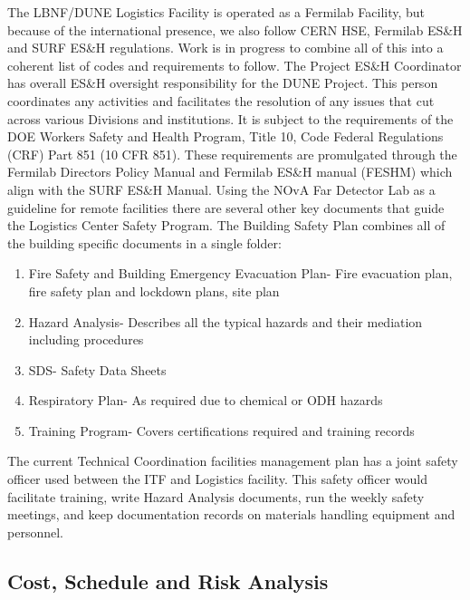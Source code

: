 The LBNF/DUNE Logistics Facility is operated as a Fermilab Facility, but because of the international presence, we also follow CERN HSE, Fermilab ES\&H and SURF ES\&H regulations.  Work is in progress to combine all of this into a coherent list of codes and requirements to follow. The  Project ES\&H Coordinator has overall ES\&H oversight responsibility for the DUNE Project.  This person coordinates any activities and facilitates the resolution of any issues that cut across various Divisions and institutions. It is subject to the requirements of the DOE Workers Safety and Health Program, Title 10, Code Federal Regulations (CRF) Part 851 (10 CFR 851). These requirements are promulgated through the Fermilab Directors Policy Manual and Fermilab ES\&H manual (FESHM) which align with the SURF ES\&H Manual. 
Using the NOvA Far Detector Lab as a guideline for remote facilities there are several other key documents that guide the Logistics Center Safety Program.  The Building Safety Plan combines all of the building specific documents in a single folder:

\begin{enumerate}
\item	Fire Safety and Building Emergency Evacuation Plan- Fire evacuation plan, fire safety plan and lockdown plans, site plan
\item	Hazard Analysis- Describes all the typical hazards and their mediation including procedures 
\item	SDS- Safety Data Sheets
\item	Respiratory Plan- As required due to chemical or ODH hazards
\item	Training Program- Covers certifications required and  training records
\end{enumerate}

The current Technical Coordination facilities management plan has a joint safety officer used between the ITF and Logistics facility. This safety officer would facilitate training, write Hazard Analysis documents, run the weekly safety meetings, and keep documentation records on materials handling equipment and personnel. 


\subsection{Cost, Schedule and Risk Analysis}
\label{sec:fdsp-tc-itf-cost}

